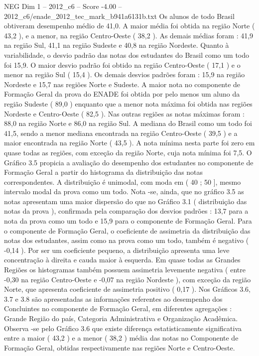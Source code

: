 \begin{textsample}{NEG Dim 1 – 2012\_c6 – Score -4.00 – 2012\_c6/enade\_2012\_tec\_mark\_b941a6131b.txt}
Os alunos de todo Brasil obtiveram desempenho médio de 41,0.
A maior média foi obtida na região Norte ( 43,2 ), e a menor, na região Centro-Oeste ( 38,2 ).
As demais médias foram : 41,9 na região Sul, 41,1 na região Sudeste e 40,8 na região Nordeste.
Quanto à variabilidade, o desvio padrão das notas dos estudantes do Brasil como um todo foi 15,9.
O maior desvio padrão foi obtido na região Centro-Oeste ( 17,1 ) e o menor na região Sul ( 15,4 ).
Os demais desvios padrões foram : 15,9 na região Nordeste e 15,7 nas regiões Norte e Sudeste.
A maior nota no componente de Formação Geral da prova do ENADE foi obtida por pelo menos um aluno da região Sudeste ( 89,0 ) enquanto que a menor nota máxima foi obtida nas regiões Nordeste e Centro-Oeste ( 82,5 ).
Nas outras regiões as notas máximas foram : 88,0 na região Norte e 86,0 na região Sul.
A mediana do Brasil como um todo foi 41,5, sendo a menor mediana encontrada na região Centro-Oeste ( 39,5 ) e a maior encontrada na região Norte ( 43,5 ).
A nota mínima nesta parte foi zero em quase todas as regiões, com exceção da região Norte, cuja nota mínima foi 7,5.
O Gráfico 3.5 propicia a avaliação do desempenho dos estudantes no componente de Formação Geral a partir do histograma da distribuição das notas correspondentes.
A distribuição é unimodal, com moda em ( 40 ; 50 ], mesmo intervalo modal da prova como um todo.
Nota -se, ainda, que no gráfico 3.5 as notas apresentam uma maior dispersão do que no Gráfico 3.1 ( distribuição das notas da prova ), confirmada pela comparação dos desvios padrões : 13,7 para a nota da prova como um todo e 15,9 para o componente de Formação Geral.
Para o componente de Formação Geral, o coeficiente de assimetria da distribuição das notas dos estudantes, assim como na prova como um todo, também é negativo ( -0,14 ).
Por ser um coeficiente pequeno, a distribuição apresenta uma leve concentração à direita e cauda maior à esquerda.
Em quase todas as Grandes Regiões os histogramas também possuem assimetria levemente negativa ( entre -0,30 na região Centro-Oeste e -0,07 na região Nordeste ), com exceção da região Norte, que apresenta coeficiente de assimetria positivo ( 0,17 ).
Nos Gráficos 3.6, 3.7 e 3.8 são apresentadas as informações referentes ao desempenho dos Concluintes no componente de Formação Geral, em diferentes agregações : Grande Região do país, Categoria Administrativa e Organização Acadêmica.
Observa -se pelo Gráfico 3.6 que existe diferença estatisticamente significativa entre a maior ( 43,2 ) e a menor ( 38,2 ) média das notas no Componente de Formação Geral, obtidas respectivamente nas regiões Norte e Centro-Oeste.

\end{textsample}
